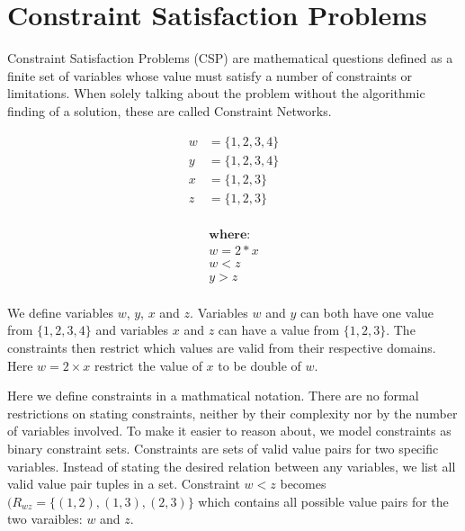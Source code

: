 
\chapter{Constraint Satisfaction Problems}

Constraint Satisfaction Problems (CSP) are mathematical questions defined as a finite set of variables whose value must satisfy a number of constraints or limitations. When solely talking about the problem without the algorithmic finding of a solution, these are called Constraint Networks.

\begin{tcolorbox}[title=Example:]
	\begin{multicols}{2}
		\begin{equation*}
			\begin{aligned}
				w & = \{1, 2, 3, 4\} \\
				y & = \{1, 2, 3, 4\} \\
				x & = \{1, 2, 3\}    \\
				z & = \{1, 2, 3\}    \\
			\end{aligned}
		\end{equation*}

		\columnbreak

		\noindent
		\begin{equation*}
			\begin{aligned}
				\textbf{where:} \\
				w = 2*x         \\
				w < z           \\
				y > z           \\
			\end{aligned}
		\end{equation*}
	\end{multicols}
\end{tcolorbox}

We define variables $w$, $y$, $x$ and $z$. Variables $w$ and $y$ can both have one value from $\{1, 2, 3, 4\}$ and variables $x$ and $z$ can have a value from $\{1, 2, 3\}$. The constraints then restrict which values are valid from their respective domains. Here $w = 2 \times x$ restrict the value of $x$ to be double of $w$.

Here we define constraints in a mathmatical notation. There are no formal restrictions on stating constraints, neither by their complexity nor by the number of variables involved. To make it easier to reason about, we model constraints as binary constraint sets. Constraints are sets of valid value pairs for two specific variables. Instead of stating the desired relation between any variables, we list all valid value pair tuples in a set. Constraint $w < z$ becomes $(R_{wz} = \{(1, 2), (1, 3), (2, 3)\}$ which contains all possible value pairs for the two varaibles: $w$ and $z$.

